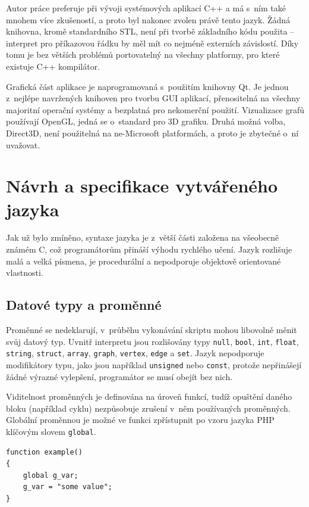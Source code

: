 \documentclass[11pt,twoside,a4paper]{book}
\begin{document}
Autor práce preferuje při vývoji systémových aplikací C++ a má s~ním také mnohem více zku\-še\-nos\-tí, a proto byl nakonec zvolen právě tento jazyk. Žádná knihovna, kromě standardního STL, není při tvorbě základního kódu použita -- interpret pro příkazovou řádku by měl mít co nejméně externích závislostí. Díky tomu je bez větších problémů portovatelný na všechny platformy, pro které existuje C++ kompilátor.

Grafická část aplikace je naprogramovaná s~použitím knihovny Qt. Je jednou z~nejlépe navržených knihoven pro tvorbu GUI aplikací, přenositelná na všechny majoritní operační systémy a bezplatná pro nekomerční použití. Vizualizace grafů používají OpenGL, jedná se o~standard pro 3D grafiku. Druhá možná volba, Direct3D, není použitelná na ne-Microsoft platformách, a proto je zbytečné o~ní uvažovat.


\section{Návrh a specifikace vytvářeného jazyka}

Jak už bylo zmíněno, syntaxe jazyka je z~větší části založena na všeobecně známém C, což programátorům přináší výhodu rychlého učení. Jazyk rozlišuje malá a velká písmena, je procedurální a nepodporuje objektově orientované vlastnosti.


\subsection{Datové typy a proměnné}
\label{datove_typy_a_promenne}

Proměnné se nedeklarují, v~průběhu vykonávání skriptu mohou libovolně měnit svůj datový typ. Uvnitř interpretu jsou rozlišovány typy \texttt{null}, \texttt{bool}, \texttt{int}, \texttt{float}, \texttt{string}, \texttt{struct}, \texttt{array}, \texttt{graph}, \texttt{vertex}, \texttt{edge} a \texttt{set}. Jazyk nepodporuje modifikátory typu, jako jsou například \texttt{unsigned} nebo \texttt{const}, protože nepřinášejí žádné výrazné vylepšení, programátor se musí obejít bez nich.

Viditelnost proměnných je definována na úroveň funkcí, tudíž opuštění daného bloku (na\-pří\-klad cyklu) nezpůsobuje zrušení v~něm používaných proměnných. Globální pro\-měn\-nou je možné ve funkci zpřístupnit po vzoru jazyka PHP klíčovým slovem \texttt{global}.

\begin{verbatim}
function example()
{
    global g_var;
    g_var = "some value";
}
\end{verbatim}
\end{document}
